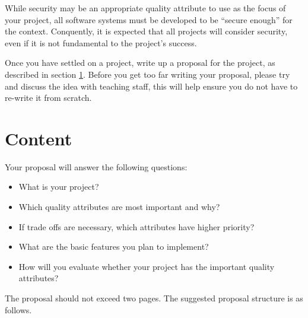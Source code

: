 \documentclass{csse4400}
\begin{document}
\noindent
While security may be an appropriate quality attribute to use as the focus of your project,
all software systems must be developed to be ``secure enough'' for the context.
Conquently, it is expected that all projects will consider security,
even if it is not fundamental to the project's success.

Once you have settled on a project, write up a proposal for the project, as described in section \ref{sect:content}.
Before you get too far writing your proposal,
please try and discuss the idea with teaching staff,
this will help ensure you do not have to re-write it from scratch.


\section{Content}\label{sect:content}
Your proposal will answer the following questions:
\begin{itemize}
    \item What is your project?
    \item Which quality attributes are most important and why?
    \item If trade offs are necessary, which attributes have higher priority?
    \item What are the basic features you plan to implement?
    \item How will you evaluate whether your project has the important quality attributes?
\end{itemize}

\noindent
The proposal should not exceed two pages.
The suggested proposal structure is as follows.
\end{document}
